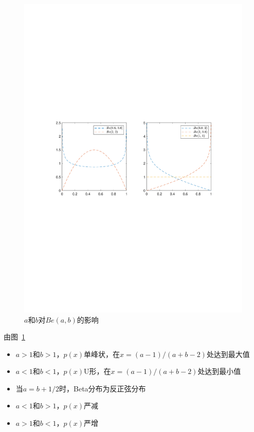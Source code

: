 \begin{figure}[htbp]
    \centering
    \includegraphics[width =\textwidth]{image/beta.pdf}
    \caption{$a$和$b$对$Be(a,b)$的影响}
    \label{fig:beta}
\end{figure}

\begin{note}
    由图~\ref{fig:beta}
    \begin{itemize}
        \item $a>1$和$b>1$，$p(x)$单峰状，在$x = (a-1)/(a+b-2)$处达到最大值
        \item $a<1$和$b<1$，$p(x)$U形，在$x = (a-1)/(a+b-2)$处达到最小值
        \item 当$a = b+1/2$时，Beta分布为反正弦分布
        \item $a<1$和$b>1$，$p(x)$严减
        \item $a>1$和$b<1$，$p(x)$严增
    \end{itemize}
    
\end{note}


